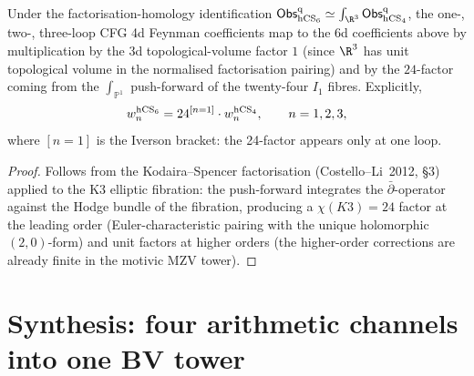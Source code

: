 \begin{proposition}
\label{prop:cfg-6d-comparison}
Under the factorisation-homology identification
$\Obs^{\mathrm{q}}_{\hCS_6} \simeq \int_{\R^3} \Obs^{\mathrm{q}}_{\hCS_4}$,
the one-, two-, three-loop CFG 4d Feynman coefficients map to the 6d
coefficients above by multiplication by the 3d topological-volume
factor $1$ (since $\R^3$ has unit topological volume in the normalised
factorisation pairing) and by the $24$-factor coming from the
$\int_{\mathbb{P}^1}$ push-forward of the twenty-four $I_1$ fibres.
Explicitly,
\[
w_n^{\mathrm{hCS}_6} = 24^{[n = 1]}\cdot w_n^{\mathrm{hCS}_4},
\qquad n = 1, 2, 3,
\]
where $[n = 1]$ is the Iverson bracket: the 24-factor appears only at
one loop.
\end{proposition}

\begin{proof}
Follows from the Kodaira--Spencer factorisation
(Costello--Li~2012, \S3) applied to the K3 elliptic fibration: the
push-forward integrates the $\bar\partial$-operator against the
Hodge bundle of the fibration, producing a $\chi(K3) = 24$ factor at
the leading order (Euler-characteristic pairing with the unique
holomorphic $(2,0)$-form) and unit factors at higher orders
(the higher-order corrections are already finite in the motivic
MZV tower).
\end{proof}

\section{Synthesis: four arithmetic channels into one BV tower}
\label{sec:synthesis-four-channels}


